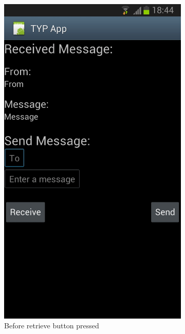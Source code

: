 \documentclass[a4paper,12pt]{report}
\begin{document}
\begin{figure}
        \centering
        \begin{subfigure}[b]{0.45\textwidth}
                \centering
                \includegraphics[scale=0.2]{images/screenshots/app1a.jpg}
                \caption{Before retrieve button pressed}
                \label{fig:app1a}
        \end{subfigure}
	\begin{subfigure}[b]{0.45\textwidth}
                \centering

\end{subfigure}
\end{figure}
\end{document}
